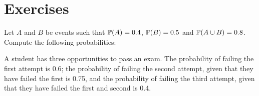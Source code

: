 \section{Exercises}

\begin{exercise}
\begin{questions}

\question
Let $A$ and $B$ be events such that $\mathbb{P}(A)=0.4$, $\mathbb{P}(B)=0.5$ and $\mathbb{P}(A\cup B)=0.8$.
Compute the following probabilities:

\question
A student has three opportunities to pass an exam. The probability of failing the first attempt is 0.6; the probability of failing the second attempt, given that they have failed the first is 0.75, and the probability of failing the third attempt, given that they have failed the first and second is 0.4.
\begin{parts}

\end{parts}
\end{questions}
\end{exercise}

